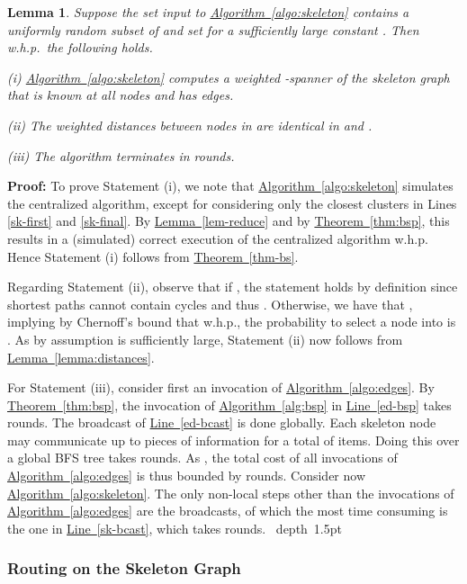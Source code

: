 \documentclass[letterpaper,11pt]{article}
\newcommand{\namedref}[2]{\hyperref[#2]{#1~\ref*{#2}}}
\newcommand{\theoremref}[1]{\namedref{Theorem}{#1}}
\newcommand{\lemmaref}[1]{\namedref{Lemma}{#1}}
\newcommand{\algref}[1]{\namedref{Algorithm}{#1}}
\newcommand{\lineref}[1]{\namedref{Line}{#1}}
\newtheorem{lemma}[theorem]{Lemma}
\newcommand{\blackslug}{\hbox{\hskip 1pt \vrule width 4pt height 8pt
depth 1.5pt \hskip 1pt}}
\newcommand{\QED}{\quad\blackslug\lower 8.5pt\null\par}
\newenvironment{proof}[1][Proof:]{\noindent \textbf{#1}\xspace}{\QED}
\begin{document}
\begin{lemma}\label{lemma:spanner}
Suppose the set  input to \algref{algo:skeleton} contains a uniformly random
subset  of  and set  for a
sufficiently large constant . Then w.h.p.\ the following holds.
\begin{compactitem}
\item[(i)] \algref{algo:skeleton} computes a weighted -spanner of
the skeleton graph  that is known at all nodes and has
 edges.
\item[(ii)] The weighted distances between nodes in  are identical in
 and .
\item[(iii)] The algorithm terminates in
 rounds.
\end{compactitem}
\end{lemma}
\begin{proof}
To prove Statement (i), we note that \algref{algo:skeleton} simulates
the centralized algorithm, except for considering only the closest
 clusters in Lines \ref{sk-first} and
\ref{sk-final}. By \lemmaref{lem-reduce} and by \theoremref{thm:bsp},
this results in a (simulated) correct execution of the centralized algorithm
w.h.p. Hence Statement (i) follows from \theoremref{thm-bs}.

Regarding Statement (ii), observe that if , the statement holds by
definition since shortest paths cannot contain cycles and thus
. Otherwise, we have that ,
implying by Chernoff's bound that w.h.p., the probability to select a node into
 is . As by assumption 
is sufficiently large, Statement (ii) now follows from
\lemmaref{lemma:distances}.

For Statement (iii), consider first an invocation of \algref{algo:edges}. By
\theoremref{thm:bsp}, the invocation of \algref{alg:bsp} in \lineref{ed-bsp}
takes  rounds.
The broadcast of \lineref{ed-bcast} is done globally. Each skeleton node may
communicate up to  pieces of information for a total of
 items. Doing this over a global BFS tree
takes  rounds. As , the total cost
of all invocations of \algref{algo:edges} is thus bounded by
 rounds. Consider now
\algref{algo:skeleton}. The only non-local steps other than the invocations of
\algref{algo:edges} are the broadcasts, of which the most time consuming is the
one in \lineref{sk-bcast}, which takes  rounds.
\end{proof}



\subsubsection*{Routing on the Skeleton Graph}
\end{document}

